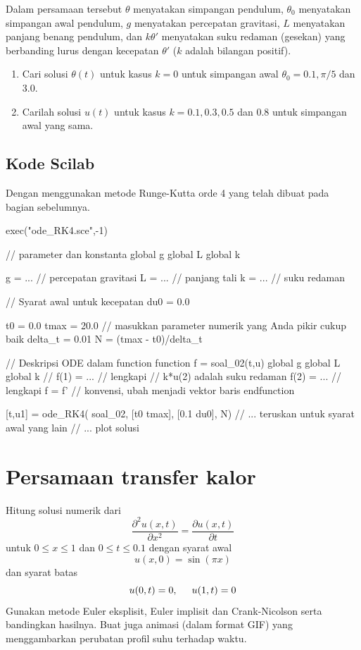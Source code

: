 \documentclass[10pt,bahasa]{article}
\begin{document}
Dalam persamaan tersebut $\theta$ menyatakan simpangan pendulum,
$\theta_0$ menyatakan simpangan awal pendulum,
$g$ menyatakan percepatan gravitasi, $L$ menyatakan panjang benang pendulum,
dan $k\theta'$ menyatakan suku redaman (gesekan) yang berbanding lurus
dengan kecepatan $\theta'$ ($k$ adalah bilangan positif).

\begin{enumerate}[label=(\alph*)]
\item Cari solusi $\theta(t)$ untuk kasus $k=0$ untuk simpangan awal $\theta_0 = 0.1, \pi/5$
dan 3.0.
\item Carilah solusi $u(t)$ untuk kasus $k = 0.1, 0.3, 0.5$ dan 0.8 untuk
simpangan awal yang sama.
\end{enumerate}

\subsection*{Kode Scilab}

Dengan menggunakan metode Runge-Kutta orde 4 yang telah dibuat
pada bagian sebelumnya.

\begin{scilabcode}
exec("ode_RK4.sce",-1)

// parameter dan konstanta
global g
global L
global k

g = ... // percepatan gravitasi
L = ... // panjang tali
k = ... // suku redaman

// Syarat awal untuk kecepatan
du0 = 0.0

t0 = 0.0
tmax = 20.0
// masukkan parameter numerik yang Anda pikir cukup baik
delta_t = 0.01
N = (tmax - t0)/delta_t

// Deskripsi ODE dalam function
function f = soal_02(t,u)
  global g
  global L
  global k
  //  
  f(1) =  ... // lengkapi
  // k*u(2) adalah suku redaman
  f(2) = ... // lengkapi
  f = f'  // konvensi, ubah menjadi vektor baris
endfunction

[t,u1] = ode_RK4( soal_02, [t0 tmax], [0.1 du0], N)
// ... teruskan untuk syarat awal yang lain
// ... plot solusi
\end{scilabcode}



\section{Persamaan transfer kalor}

Hitung solusi numerik dari
\begin{equation}
\frac{\partial^2 u(x,t)}{\partial x^2} = \frac{\partial u(x,t)}{\partial t}
\end{equation}
untuk $0 \leq x \leq 1$ dan $0 \leq t \leq 0.1$ dengan syarat awal
\begin{equation}
u(x,0) = \sin(\pi x)
\end{equation}
dan syarat batas
\begin{equation}
u(0,t) = 0,\hspace{0.5cm} u(1,t) = 0
\end{equation}
Gunakan metode Euler eksplisit, Euler implisit dan Crank-Nicolson serta
bandingkan hasilnya.
Buat juga animasi (dalam format GIF) yang menggambarkan perubatan profil
suhu terhadap waktu.
\end{document}
